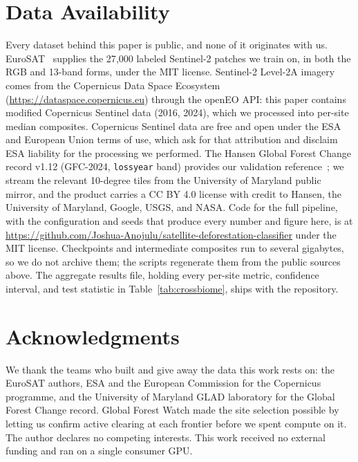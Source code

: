 \documentclass[journal]{IEEEtran}
\begin{document}
\section*{Data Availability}
Every dataset behind this paper is public, and none of it originates with us.
EuroSAT~\cite{helber2019} supplies the 27{,}000 labeled Sentinel-2 patches we train
on, in both the RGB and 13-band forms, under the MIT license. Sentinel-2 Level-2A
imagery comes from the Copernicus Data Space Ecosystem
(\url{https://dataspace.copernicus.eu}) through the openEO API: this paper contains
modified Copernicus Sentinel data (2016, 2024), which we processed into per-site
median composites. Copernicus Sentinel data are free and open under the ESA and
European Union terms of use, which ask for that attribution and disclaim ESA
liability for the processing we performed. The Hansen Global Forest Change record
v1.12 (GFC-2024, \texttt{lossyear} band) provides our validation
reference~\cite{hansen2013}; we stream the relevant 10-degree tiles from the
University of Maryland public mirror, and the product carries a CC BY 4.0 license
with credit to Hansen, the University of Maryland, Google, USGS, and NASA. Code for
the full pipeline, with the configuration and seeds that produce every number and
figure here, is at
\url{https://github.com/Joshua-Anojulu/satellite-deforestation-classifier} under the
MIT license. Checkpoints and intermediate composites run to several gigabytes, so we
do not archive them; the scripts regenerate them from the public sources above. The
aggregate results file, holding every per-site metric, confidence interval, and test
statistic in Table~\ref{tab:crossbiome}, ships with the repository.

\section*{Acknowledgments}
We thank the teams who built and give away the data this work rests on: the EuroSAT
authors, ESA and the European Commission for the Copernicus programme, and the
University of Maryland GLAD laboratory for the Global Forest Change record. Global
Forest Watch made the site selection possible by letting us confirm active clearing
at each frontier before we spent compute on it. The author declares no competing
interests. This work received no external funding and ran on a single consumer GPU.
\end{document}
